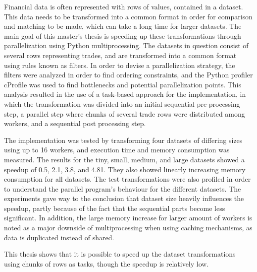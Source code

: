 Financial data is often represented with rows of values, contained in a dataset. This data needs to be transformed into a common format in order for
comparison and matching to be made, which can take a long time for larger datasets.
The main goal of this master’s thesis is speeding up these transformations through parallelization using Python multiprocessing.
The datasets in question consist of several rows representing trades, and are transformed into a common format using rules known as filters. In order to devise a
parallelization strategy, the filters were analyzed in order to find ordering constraints, and the Python profiler cProfile was used to find bottlenecks
and potential parallelization points. This analysis resulted in the use of a task-based approach for the implementation, in which the transformation
was divided into an initial sequential pre-processing step, a parallel step where chunks of several trade rows were distributed among workers, and a
sequential post processing step. 

The implementation was tested by transforming four datasets of differing sizes using up to 16 workers, and execution time and memory consumption
was measured. The results for the tiny, small, medium, and large datasets showed a speedup of 0.5, 2.1, 3.8, and 4.81. They also showed linearly increasing
memory consumption for all datasets.  The test transformations were also profiled in order to understand the parallel program’s behaviour for the
different datasets. The experiments gave way to the conclusion that dataset size heavily influences the speedup, partly because of the fact that
the sequential parts become less significant.  In addition, the large memory increase for larger amount of workers is noted as a major downside of
multiprocessing when using caching mechanisms, as data is duplicated instead of shared.

This thesis shows that it is possible to speed up the dataset transformations using chunks of rows as tasks, though the speedup is relatively low.
